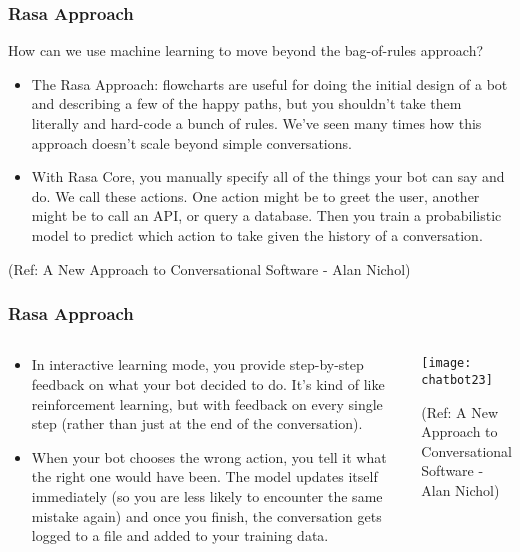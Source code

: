  \begin{frame}[fragile]\frametitle{Rasa Approach}
 
 How can we use machine learning to move beyond the bag-of-rules approach?
 
\begin{itemize}
\item The Rasa Approach: flowcharts are useful for doing the initial design of a bot and describing a few of the happy paths, but you shouldn't take them literally and hard-code a bunch of rules. We've seen many times how this approach doesn't scale beyond simple conversations.
\item With Rasa Core, you manually specify all of the things your bot can say and do. We call these actions. One action might be to greet the user, another might be to call an API, or query a database. Then you train a probabilistic model to predict which action to take given the history of a conversation.
\end{itemize}

{\tiny (Ref: A New Approach to Conversational Software - Alan Nichol)}


\end{frame}

 \begin{frame}[fragile]\frametitle{Rasa Approach}
 
\begin{columns}
\begin{column}[T]{0.5\linewidth}

\begin{itemize}
\item In interactive learning mode, you provide step-by-step feedback on what your bot decided to do. It's kind of like reinforcement learning, but with feedback on every single step (rather than just at the end of the conversation).

\item When your bot chooses the wrong action, you tell it what the right one would have been. The model updates itself immediately (so you are less likely to encounter the same mistake again) and once you finish, the conversation gets logged to a file and added to your training data.
\end{itemize}

\end{column}
\begin{column}[T]{0.5\linewidth}

\begin{center}
\texttt{[image: chatbot23]}

\end{center}

{\tiny (Ref: A New Approach to Conversational Software - Alan Nichol)}

\end{column}
\end{columns}
\end{frame}


